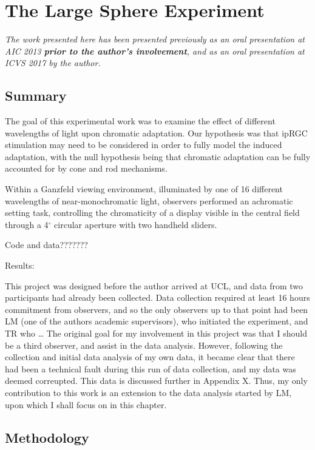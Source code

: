 \chapter{The Large Sphere Experiment} %
\label{chap:LargeSphere}

\textit{The work presented here has been presented previously as an oral presentation at AIC 2013 \citep[p. 623]{macdonald_chromatic_2013} \textbf{prior to the author's involvement}, and as an oral presentation at ICVS 2017 \citep[p. 35/58]{jan_kremers_24th_2017} by the author.}

\section{Summary}

The goal of this experimental work was to examine the effect of different wavelengths of light upon chromatic adaptation. Our hypothesis was that \gls{ipRGC} stimulation may need to be considered in order to fully model the induced adaptation, with the null hypothesis being that chromatic adaptation can be fully accounted for by cone and rod mechanisms.

Within a Ganzfeld viewing environment, illuminated by one of 16 different wavelengths of near-monochromatic light, observers performed an achromatic setting task, controlling the chromaticity of a display visible in the central field through a 4$^{\circ}$ circular aperture with two handheld sliders.

Code and data??????? %

Results:

This project was designed before the author arrived at \gls{UCL}, and data from two participants had already been collected. Data collection required at least 16 hours commitment from observers, and so the only observers up to that point had been LM (one of the authors academic supervisors), who initiated the experiment, and TR who \dots %
The original goal for my involvement in this project was that I should be a third observer, and assist in the data analysis. However, following the collection and initial data analysis of my own data, it became clear that there had been a technical fault during this run of data collection, and my data was deemed correupted. This data is discussed further in Appendix X. %
Thus, my only contribution to this work is an extension to the data analysis started by LM, upon which I shall focus on in this chapter.

\section{Methodology}

